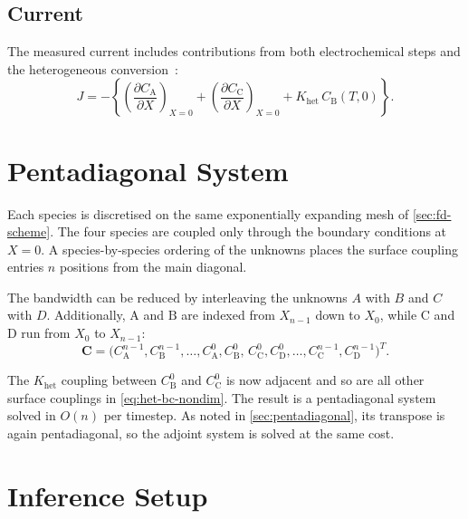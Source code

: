 \subsection{Current}

The measured current includes contributions from both electrochemical
steps and the heterogeneous conversion~\cite{compton2014understanding}:
\begin{equation}\label{eq:het-current}
  J = -\left\{
    \left(\frac{\partial C_\mathrm{A}}{\partial X}\right)_{X=0}
    + \left(\frac{\partial C_\mathrm{C}}{\partial X}\right)_{X=0}
    + K_{\mathrm{het}}\, C_\mathrm{B}(T, 0)
  \right\}.
\end{equation}

\section{Pentadiagonal System}\label{sec:het-disc}

Each species is discretised on the same exponentially expanding mesh of
\cref{sec:fd-scheme}. The four species are coupled only through the
boundary conditions at $X = 0$. A species-by-species ordering of
the unknowns places the surface coupling entries $n$ positions
from the main diagonal.

The bandwidth can be reduced by interleaving the unknowns $A$ with
$B$ and $C$ with $D$. Additionally, $\mathrm{A}$ and $\mathrm{B}$ are
indexed from $X_{n-1}$ down to $X_0$, while $\mathrm{C}$ and
$\mathrm{D}$ run from $X_0$ to $X_{n-1}$:
\begin{equation}\label{eq:het-ordering}
  \mathbf{C} = \bigl(
    C_\mathrm{A}^{n-1}, C_\mathrm{B}^{n-1}, \ldots,
    C_\mathrm{A}^{0}, C_\mathrm{B}^{0},\,
    C_\mathrm{C}^{0}, C_\mathrm{D}^{0}, \ldots,
    C_\mathrm{C}^{n-1}, C_\mathrm{D}^{n-1}
  \bigr)^T.
\end{equation}

The $K_{\mathrm{het}}$ coupling between $C_\mathrm{B}^0$ and
$C_\mathrm{C}^0$ is now adjacent and so are all other surface
couplings in \cref{eq:het-bc-nondim}. The result is a pentadiagonal
system solved in $O(n)$ per timestep. As noted in
\cref{sec:pentadiagonal}, its transpose is again pentadiagonal, so
the adjoint system is solved at the same cost.

\section{Inference Setup}\label{sec:het-inference}

